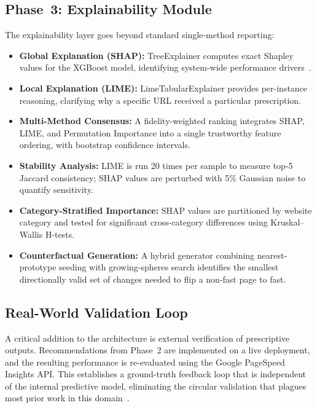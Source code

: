 \documentclass[sn-nature]{sn-jnl}
\begin{document}
\subsection{Phase~3: Explainability Module}

The explainability layer goes beyond standard single-method reporting:

\begin{itemize}
    \item \textbf{Global Explanation (SHAP):} TreeExplainer computes exact Shapley values for the XGBoost model, identifying system-wide performance drivers~\cite{salih2024}.

    \item \textbf{Local Explanation (LIME):} LimeTabularExplainer provides per-instance reasoning, clarifying why a specific URL received a particular prescription.

    \item \textbf{Multi-Method Consensus:} A fidelity-weighted ranking integrates SHAP, LIME, and Permutation Importance into a single trustworthy feature ordering, with bootstrap confidence intervals.

    \item \textbf{Stability Analysis:} LIME is run 20 times per sample to measure top-5 Jaccard consistency; SHAP values are perturbed with 5\% Gaussian noise to quantify sensitivity.

    \item \textbf{Category-Stratified Importance:} SHAP values are partitioned by website category and tested for significant cross-category differences using Kruskal--Wallis H-tests.

    \item \textbf{Counterfactual Generation:} A hybrid generator combining nearest-prototype seeding with growing-spheres search identifies the smallest directionally valid set of changes needed to flip a non-fast page to fast.
\end{itemize}

\subsection{Real-World Validation Loop}

A critical addition to the architecture is external verification of prescriptive outputs. Recommendations from Phase~2 are implemented on a live deployment, and the resulting performance is re-evaluated using the Google PageSpeed Insights API. This establishes a ground-truth feedback loop that is independent of the internal predictive model, eliminating the circular validation that plagues most prior work in this domain~\cite{vanriet2023}.
\end{document}
